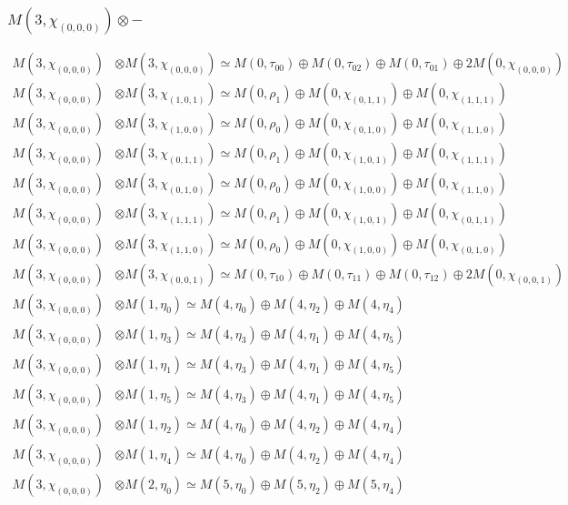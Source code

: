 \subsubsection{$ M(3,\chi_{(0,0,0)})\otimes -$}
\begin{align*}
M(3,\chi_{(0,0,0)}) &\otimes M(3,\chi_{(0,0,0)}) \simeq M(0,\tau_{00}) \oplus M(0,\tau_{02}) \oplus M(0,\tau_{01}) \oplus 2 M(0,\chi_{(0,0,0)})\\
M(3,\chi_{(0,0,0)}) &\otimes M(3,\chi_{(1,0,1)}) \simeq M(0,\rho_{1}) \oplus M(0,\chi_{(0,1,1)}) \oplus M(0,\chi_{(1,1,1)})\\
M(3,\chi_{(0,0,0)}) &\otimes M(3,\chi_{(1,0,0)}) \simeq M(0,\rho_{0}) \oplus M(0,\chi_{(0,1,0)}) \oplus M(0,\chi_{(1,1,0)})\\
M(3,\chi_{(0,0,0)}) &\otimes M(3,\chi_{(0,1,1)}) \simeq M(0,\rho_{1}) \oplus M(0,\chi_{(1,0,1)}) \oplus M(0,\chi_{(1,1,1)})\\
M(3,\chi_{(0,0,0)}) &\otimes M(3,\chi_{(0,1,0)}) \simeq M(0,\rho_{0}) \oplus M(0,\chi_{(1,0,0)}) \oplus M(0,\chi_{(1,1,0)})\\
M(3,\chi_{(0,0,0)}) &\otimes M(3,\chi_{(1,1,1)}) \simeq M(0,\rho_{1}) \oplus M(0,\chi_{(1,0,1)}) \oplus M(0,\chi_{(0,1,1)})\\
M(3,\chi_{(0,0,0)}) &\otimes M(3,\chi_{(1,1,0)}) \simeq M(0,\rho_{0}) \oplus M(0,\chi_{(1,0,0)}) \oplus M(0,\chi_{(0,1,0)})\\
M(3,\chi_{(0,0,0)}) &\otimes M(3,\chi_{(0,0,1)}) \simeq M(0,\tau_{10}) \oplus M(0,\tau_{11}) \oplus M(0,\tau_{12}) \oplus 2 M(0,\chi_{(0,0,1)})\\
M(3,\chi_{(0,0,0)}) &\otimes M(1,\eta_{0}) \simeq M(4,\eta_{0}) \oplus M(4,\eta_{2}) \oplus M(4,\eta_{4})\\
M(3,\chi_{(0,0,0)}) &\otimes M(1,\eta_{3}) \simeq M(4,\eta_{3}) \oplus M(4,\eta_{1}) \oplus M(4,\eta_{5})\\
M(3,\chi_{(0,0,0)}) &\otimes M(1,\eta_{1}) \simeq M(4,\eta_{3}) \oplus M(4,\eta_{1}) \oplus M(4,\eta_{5})\\
M(3,\chi_{(0,0,0)}) &\otimes M(1,\eta_{5}) \simeq M(4,\eta_{3}) \oplus M(4,\eta_{1}) \oplus M(4,\eta_{5})\\
M(3,\chi_{(0,0,0)}) &\otimes M(1,\eta_{2}) \simeq M(4,\eta_{0}) \oplus M(4,\eta_{2}) \oplus M(4,\eta_{4})\\
M(3,\chi_{(0,0,0)}) &\otimes M(1,\eta_{4}) \simeq M(4,\eta_{0}) \oplus M(4,\eta_{2}) \oplus M(4,\eta_{4})\\
M(3,\chi_{(0,0,0)}) &\otimes M(2,\eta_{0}) \simeq M(5,\eta_{0}) \oplus M(5,\eta_{2}) \oplus M(5,\eta_{4})\\

\end{align*}
